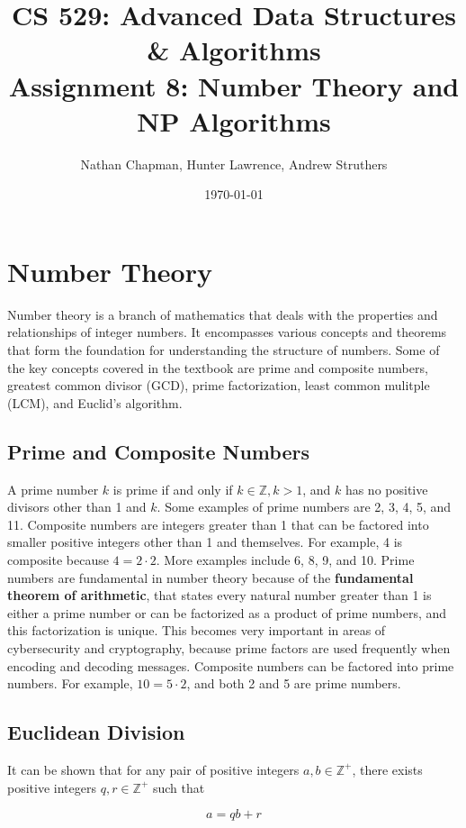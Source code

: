 \documentclass{article}
\title{\vspace*{-0.625in}CS 529: Advanced Data Structures \& Algorithms \\ Assignment 8: Number Theory and NP Algorithms}
\author{Nathan Chapman, Hunter Lawrence, Andrew Struthers}
\date{\today}
\renewcommand{\_}{\ifincsname_\else\legacyunderscore\fi}
\begin{document}
\maketitle

\section*{Number Theory}

    Number theory is a branch of mathematics that deals with the properties and relationships of integer numbers. It encompasses various concepts and theorems that form the foundation for understanding the structure of numbers. Some of the key concepts covered in the textbook are prime and composite numbers, greatest common divisor (GCD), prime factorization, least common mulitple (LCM), and Euclid's algorithm.

    \subsection*{Prime and Composite Numbers}
    A prime number $k$ is prime if and only if $k\in \mathbb{Z}, k>1$, and $k$ has no positive divisors other than 1 and $k$. Some examples of prime numbers are 2, 3, 4, 5, and 11. Composite numbers are integers greater than 1 that can be factored into smaller positive integers other than 1 and themselves. For example, 4 is composite because $4 = 2 \cdot 2$. More examples include 6, 8, 9, and 10. Prime numbers are fundamental in number theory because of the \textbf{fundamental theorem of arithmetic}, that states every natural number greater than 1 is either a prime number or can be factorized as a product of prime numbers, and this factorization is unique. This becomes very important in areas of cybersecurity and cryptography, because prime factors are used frequently when encoding and decoding messages. Composite numbers can be factored into prime numbers. For example, $10 = 5 \cdot 2$, and both 2 and 5 are prime numbers. 

    \subsection*{Euclidean Division}

        It can be shown that for any pair of positive integers $a, b \in \mathbb{Z}^+$, there exists positive integers $q, r \in \mathbb{Z}^+$ such that 

        \begin{equation}
            a = q b + r
        \end{equation}
\end{document}
